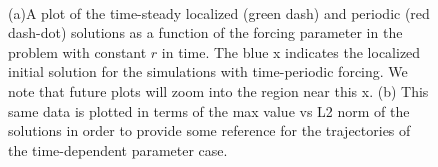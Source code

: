 \documentclass[pre,preprint,superscriptaddress]{revtex4-1}
\begin{document}
\begin{figure}[h]
  \begin{center}
    \mbox{
       \quad
      }
    \caption{(a)A plot of the time-steady localized (green dash) and periodic (red dash-dot) solutions as a function of the forcing parameter in the problem with constant $r$ in time.  The blue x indicates the localized initial solution for the simulations with time-periodic forcing.  We note that future plots will zoom into the region near this x.  (b) This same data is plotted in terms of the max value vs L2 norm of the solutions in order to provide some reference for the trajectories of the time-dependent parameter case. }
    \label{fig:FillDomain}
  \end{center}
\end{figure} 


\end{document}
